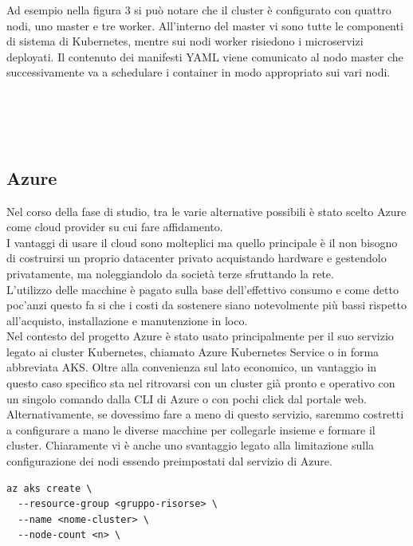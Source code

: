 \documentclass[a4paper,12pt]{report}
\begin{document}
Ad esempio nella figura 3 si può notare che il cluster è configurato con quattro nodi, uno master e tre worker. All'interno del master vi sono tutte le componenti di sistema di Kubernetes, mentre sui nodi worker risiedono i microservizi deployati. Il contenuto dei manifesti YAML viene comunicato al nodo master che successivamente va a schedulare i container in modo appropriato sui vari nodi.\\ \\ \\ \\ \\
\subsection{Azure}
Nel corso della fase di studio, tra le varie alternative possibili è stato scelto Azure come cloud provider su cui fare affidamento.\\
I vantaggi di usare il cloud sono molteplici ma quello principale è il non bisogno di costruirsi un proprio datacenter privato acquistando hardware e gestendolo privatamente, ma noleggiandolo da società terze sfruttando la rete.\cite{cloud}\\
L'utilizzo delle macchine è pagato sulla base dell'effettivo consumo e come detto poc'anzi questo fa si che i costi da sostenere siano notevolmente più bassi rispetto all'acquisto, installazione e manutenzione in loco.\\
Nel contesto del progetto Azure è stato usato principalmente per il suo servizio legato ai cluster Kubernetes, chiamato Azure Kubernetes Service o in forma abbreviata AKS. Oltre alla convenienza sul lato economico, un vantaggio in questo caso specifico sta nel ritrovarsi con un cluster già pronto e operativo con un singolo comando dalla CLI di Azure o con pochi click dal portale web.\\
Alternativamente, se dovessimo fare a meno di questo servizio, saremmo costretti a configurare a mano le diverse macchine per collegarle insieme e formare il cluster. Chiaramente vi è anche uno svantaggio legato alla limitazione sulla configurazione dei nodi essendo preimpostati dal servizio di Azure.
\begin{lstlisting}[caption={\\\textit{Esempio di comando per creare un cluster Kubernetes come servizio di Azure da Azure CLI. Gli argomenti passati sono il gruppo risorse in cui deployare la risorsa di tipo AKS, il nome attribuito al cluster e il numero di nodi desiderati.}}]
az aks create \
  --resource-group <gruppo-risorse> \
  --name <nome-cluster> \
  --node-count <n> \
\end{lstlisting}
\end{document}
